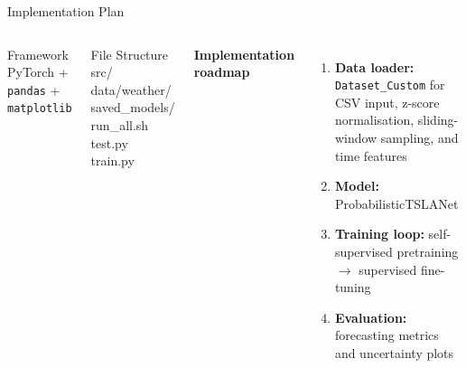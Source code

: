 \documentclass[10pt]{beamer}
\begin{document}
\begin{frame}{Implementation Plan}
\small

\begin{columns}[T,onlytextwidth]

    \begin{alertblock}{Framework}
    PyTorch + \texttt{pandas} + \texttt{matplotlib}
    \end{alertblock}

    \begin{exampleblock}{File Structure}
    \ttfamily
    \footnotesize
    src/\\
    \hspace*{1em}data/weather/\\
    \hspace*{1em}saved\_models/\\
    \hspace*{1em}run\_all.sh\\
    \hspace*{1em}test.py\\
    \hspace*{1em}train.py
    \end{exampleblock}
    
    \textbf{Implementation roadmap}
    \vspace{0.2cm}
    
    \begin{enumerate}
        \item \textbf{Data loader:} \texttt{Dataset\_Custom} for CSV input, z-score normalisation, sliding-window sampling, and time features
        
        \item \textbf{Model:} ProbabilisticTSLANet
        
        \item \textbf{Training loop:} self-supervised pretraining $\rightarrow$ supervised fine-tuning
        
        \item \textbf{Evaluation:} forecasting metrics and uncertainty plots
    \end{enumerate}

\end{columns}

\end{frame}
\end{document}
